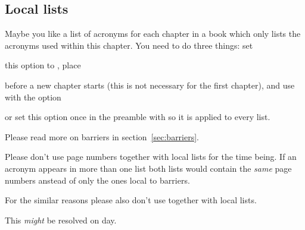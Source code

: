 \documentclass{acro-manual}
\begin{document}
\subsection{Local lists}\label{sec:local-lists}
Maybe you like a list of acronyms for each chapter in a book which only lists
the acronyms used within this chapter.  You need to do three things: set
\begin{options}
    this option to , place
\end{options}
\begin{commands}
    before a new chapter starts (this is not necessary for the first chapter),
    and use  with the option
\end{commands}
\begin{options}
    or set this option once in the preamble with  so it is applied
    to every list.
\end{options}
Please read more on barriers in section~\vref{sec:barriers}.
\begin{bewareofthedog}
  Please don't use page numbers together with local lists for the time being.
  If an acronym appears in more than one list both lists would contain the
  \emph{same} page numbers anstead of only the ones local to barriers.

  For the similar reasons please also don't use  together
  with local lists.

  This \emph{might} be resolved on day.
\end{bewareofthedog}
\end{document}
